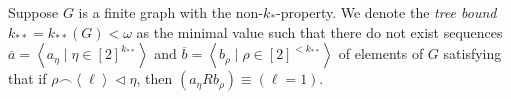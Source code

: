     \label{tree_bound}
        Suppose $G$ is a finite graph with the non-$k_*$-property.
        We denote the \emph{tree bound} $k_{**} = k_{**}(G) < \omega$ as the minimal value such that there
        do not exist sequences $\overline{a} = \left< a_\eta \mid \eta \in \left[ 2 \right]^{k_{**}} \right>$ and
        $\overline{b} = \left< b_\rho \mid \rho \in \left[ 2 \right]^{<k_{**}} \right>$ of elements of $G$ satisfying that
        if $\rho \frown \left< \ell \right> \triangleleft \eta$, then $\left( a_\eta R b_\rho \right) \equiv \left( \ell = 1 \right)$.
